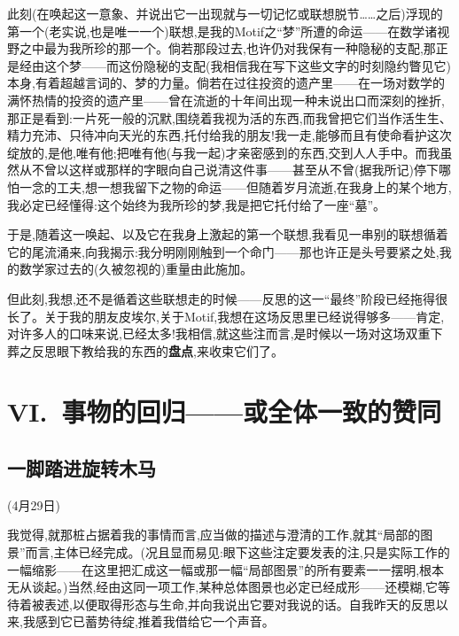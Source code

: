\dmark{}此刻(在唤起这一意象、并说出它一出现就与一切记忆或联想脱节……之后)浮现的第一个(老实说,也是唯一一个)联想,是我的Motif之“梦”所遭的命运——在数学诸视野之中最为我所珍的那一个。倘若那段过去,也许仍对我保有一种隐秘的支配,那正是经由这个梦——而这份隐秘的支配(我相信我在写下这些文字的时刻隐约瞥见它)本身,有着超越言词的、梦的力量。倘若在过往投资的遗产里——在一场对数学的满怀热情的投资的遗产里——曾在流逝的十年间出现一种未说出口而深刻的挫折,那正是看到:一片死一般的沉默,围绕着我视为活的东西,而我曾把它们当作活生生、精力充沛、只待冲向天光的东西,托付给我的朋友!我一走,能够而且有使命看护这次绽放的,是他,唯有他;把唯有他(与我一起)才亲密感到的东西,交到人人手中。而我虽然从不曾以这样或那样的字眼向自己说清这件事——甚至从不曾(据我所记)停下哪怕一念的工夫,想一想我留下之物的命运——但随着岁月流逝,在我身上的某个地方,我必定已经懂得:这个始终为我所珍的梦,我是把它托付给了一座“墓”。

于是,随着这一唤起、以及它在我身上激起的第一个联想,我看见一串别的联想循着它的尾流涌来,向我揭示:我分明刚刚触到一个命门——那也许正是头号要紧之处,我的数学家过去的(久被忽视的)重量由此施加。

但此刻,我想,还不是循着这些联想走的时候——反思的这一“最终”阶段已经拖得很长了。关于我的朋友皮埃尔,关于Motif,我想在这场反思里已经说得够多——肯定,对许多人的口味来说,已经太多!我相信,就这些注而言,是时候以一场对这场双重下葬之反思眼下教给我的东西的\textbf{盘点},来收束它们了。

\section{VI.~事物的回归——或全体一致的赞同}

\subsection{一脚踏进旋转木马}


(4月29日)\dotfill{}

\pmark {}我觉得,就那桩占据着我的事情而言,应当做的描述与澄清的工作,就其“局部的图景”而言,主体已经完成。(况且显而易见:眼下这些注定要发表的注,只是实际工作的一幅缩影——在这里把汇成这一幅或那一幅“局部图景”的所有要素一一摆明,根本无从谈起。)当然,经由这同一项工作,某种总体图景也必定已经成形——还模糊,它等待着被表述,以便取得形态与生命,并向我说出它要对我说的话。自我昨天的反思以来,我感到它已蓄势待绽,推着我借给它一个声音。

